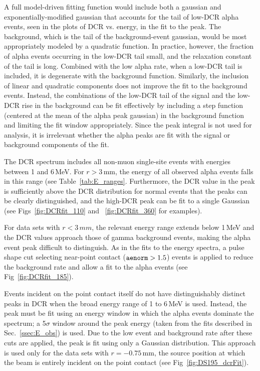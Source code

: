 A full model-driven fitting function would include both a gaussian and exponentially-modified gaussian that accounts for the tail of low-DCR alpha events, seen in the plots of DCR vs. energy, in the fit to the peak. The background, which is the tail of the background-event gaussian, would be most appropriately modeled by a quadratic function. In practice, however, the fraction of alpha events occurring in the low-DCR tail small, and the relaxation constant of the tail is long. Combined with the low alpha rate, when a low-DCR tail is included, it is degenerate with the background function. Similarly, the inclusion of linear and quadratic components does not improve the fit to the background events. Instead, the combinations of the low-DCR tail of the signal and the low-DCR rise in the background can be fit effectively by including a step function (centered at the mean of the alpha peak gaussian) in the background function and limiting the fit window appropriately. Since the peak integral is not used for analysis, it is irrelevant whether the alpha peaks are fit with the signal or background components of the fit. 

The DCR spectrum includes all non-muon single-site events with energies between 1 and 6\,MeV. For $r > 3$\,mm, the energy of all observed alpha events falls in this range (see Table~\ref{tab:E_ranges}. Furthermore, the DCR value in the peak is sufficiently above the DCR distribution for normal events that the peaks can be clearly distinguished, and the high-DCR peak can be fit to a single Gaussian (see Figs~\ref{fig:DCRfit_110} and ~\ref{fig:DCRfit_360} for examples).

For data sets with $r<3\,mm$, the relevant energy range extends below 1\,MeV and the DCR values approach those of gamma background events, making the alpha event peak difficult to distinguish. As in the fits to the energy spectra, a pulse shape cut selecting near-point contact (${\tt aenorm} > 1.5$) events is applied to reduce the background rate and allow a fit to the alpha events (see Fig~\ref{fig:DCRfit_185}).

Events incident on the point contact itself do not have distinguishably distinct peaks in DCR when the broad energy range of 1 to 6\,MeV is used. Instead, the peak must be fit using an energy window in which the alpha events dominate the spectrum; a 5$\sigma$ window around the peak energy (taken from the fits described in Sec.~\ref{ssec:E_obs}) is used. Due to the low event and background rate after these cuts are applied, the peak is fit using only a Gaussian distribution. This approach is used only for the data sets with $r=-0.75$\,mm, the source position at which the beam is entirely incident on the point contact (see Fig~\ref{fig:DS195_dcrFit}).

